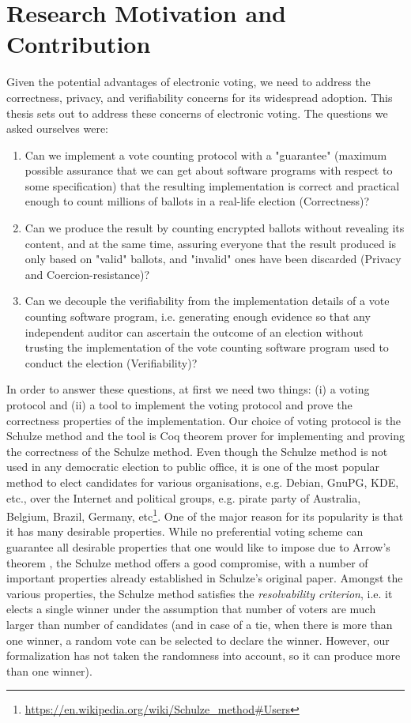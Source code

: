 \section{Research Motivation and Contribution}
Given the potential advantages of electronic voting,  we need to address
the correctness, privacy, and verifiability concerns for its widespread adoption. 
This thesis sets out to address these concerns of electronic voting. 
The questions we asked ourselves were:
 \begin{enumerate} 
  \item Can we implement a vote counting protocol with a "guarantee"
  (maximum possible assurance that we can get about software programs
   with respect to some specification) 
   that the resulting implementation is correct and  practical enough
    to count  millions of ballots in a real-life election (Correctness)?

  \item Can we produce the result by counting encrypted ballots without revealing 
  its content, and at the same time, 
  assuring everyone that the result produced is only based on "valid" ballots, 
  and "invalid" ones have been discarded  (Privacy and Coercion-resistance)?
 \item Can we decouple the verifiability from the implementation details of a vote counting software program, i.e. 
    generating enough evidence so that any independent auditor can 
    ascertain the outcome of an election without trusting the implementation 
    of the vote counting software program used to conduct the election (Verifiability)?
  \end{enumerate}


In order to answer these questions, at first we need two things: (i) a voting protocol and 
(ii) a tool to implement the voting protocol and prove the correctness properties of the implementation. 
Our choice of voting protocol is the   Schulze method \citep{Schulze:2011:NMC} and 
the tool is Coq \citep{Bertot:2004:ITP} theorem prover  for implementing and proving 
the correctness of  the Schulze method.
Even though the Schulze method is not used in any democratic election to public office,
it is one of the most popular method to elect candidates for various organisations, e.g. Debian, GnuPG, 
KDE,  etc., over the Internet and political groups,  e.g.  pirate party of Australia, Belgium, Brazil, 
Germany, etc\footnote{\url{https://en.wikipedia.org/wiki/Schulze_method#Users}}.
One of the major reason for its popularity is that it has many desirable properties.
While no preferential voting scheme can guarantee all desirable properties that one would
like to impose due to Arrow’s theorem \citep{Arrow:1950:DCS}, the Schulze method offers a good compromise, 
with a number of important properties already  established  in  Schulze’s  original  paper. 
Amongst the various  properties, the Schulze method satisfies the \textit{resolvability criterion}, 
i.e. it elects a single winner under the assumption that number of voters are much larger than
 number of candidates (and in case of a tie, when there is more than one winner, a random vote can be 
selected to declare the winner.  However, our formalization 
has not taken the randomness into account, so it can produce more than one winner). 


